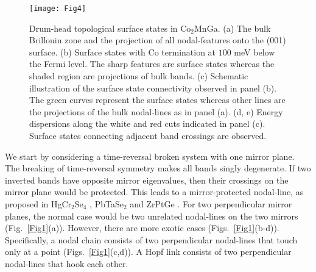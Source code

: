 \documentclass[aps,prl,superscriptaddress,twocolumn,showpacs]{revtex4-1}
\begin{document}
\begin{figure}
\texttt{[image: Fig4]}
\caption{ {Drum-head topological surface states in Co$_{2}$MnGa.} ({a}) The bulk Brillouin zone and the projection of all nodal-features onto the (001) surface.  ({b}) Surface states with Co termination at $100$ meV below the Fermi level. The sharp features are surface states whereas the shaded region are projections of bulk bands. ({c}) Schematic illustration of the surface state connectivity observed in panel (b). The green curves represent the surface states whereas other lines are the projections of the bulk nodal-lines as in panel (a). ({d, e}) Energy dispersions along the white and red cuts indicated in panel (c). Surface states connecting adjacent band crossings are observed.}
\label{Fig4}
\end{figure}

We start by considering a time-reversal broken system with one mirror plane. The breaking of time-reversal symmetry makes all bands singly degenerate. If two inverted bands have opposite mirror eigenvalues, then their crossings on the mirror plane would be protected. This leads to a mirror-protected nodal-line, as proposed in HgCr$_2$Se$_4$ \cite{Chen}, PbTaSe$_2$ \cite{PTS} and ZrPtGe \cite{ZPG}. For two perpendicular mirror planes, the normal case would be two unrelated nodal-lines on the two mirrors (Fig.~\ref{Fig1}(a)). However, there are more exotic cases (Figs.~\ref{Fig1}(b-d)). Specifically, a nodal chain consists of two perpendicular nodal-lines that touch only at a point (Figs.~\ref{Fig1}(c,d)). A Hopf link consists of two perpendicular nodal-lines that hook each other. %
\end{document}
